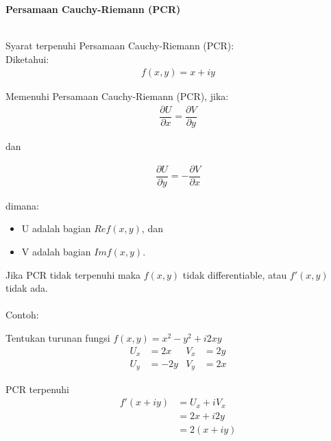 \documentclass{article}
\begin{document}
    \newpage
    \begin{center}
        \textbf{Persamaan Cauchy-Riemann (PCR)}
    \end{center}
    \leavevmode\\

    Syarat terpenuhi Persamaan Cauchy-Riemann (PCR):\\

    Diketahui:
    \begin{align}
        f(x,y) = x + iy
        \nonumber
    \end{align}
    
    Memenuhi Persamaan Cauchy-Riemann (PCR), jika:
    \begin{align}
        \dfrac{\partial U}{\partial x} = \dfrac{\partial V}{\partial y}
    \end{align}
    \begin{center}
        dan
    \end{center}
    \begin{align}
        \dfrac{\partial U}{\partial y} = -\dfrac{\partial V}{\partial x}
    \end{align}

    dimana:
    \begin{itemize}
        \item U adalah bagian $Re f(x,y)$, dan
        \item V adalah bagian $Im f(x,y)$.
    \end{itemize}

    Jika PCR tidak terpenuhi maka $f(x,y)$ tidak differentiable, atau $f'(x,y)$ tidak ada.
    \leavevmode\\ \\

    Contoh: 
    
    Tentukan turunan fungsi $f(x,y) = x^2 -y^2 + i2xy$
    \begin{align}
        U_x &= 2x        &V_x &= 2y
        \nonumber\\
        U_y &= -2y       &V_y &= 2x
        \nonumber
    \end{align}
    
    PCR terpenuhi
    \begin{align}
        f'(x+iy)    &= U_x +iV_x
                    \nonumber\\
                    &= 2x +i2y
                    \nonumber\\
                    &= 2(x+iy)
                    \nonumber
    \end{align}
\end{document}
